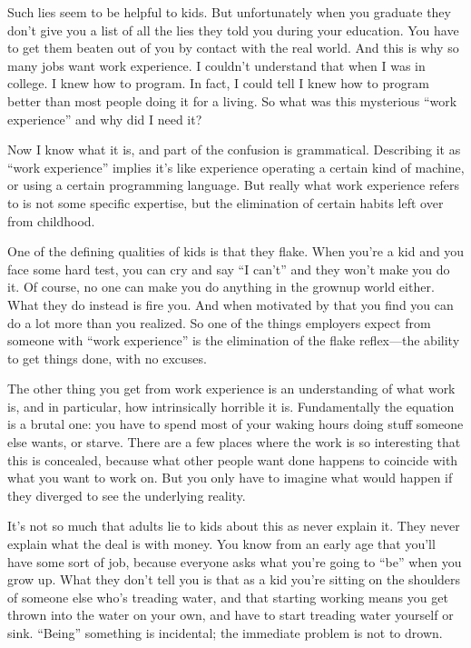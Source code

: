 Such lies seem to be helpful to kids. But unfortunately when you
graduate they don't give you a list of all the lies they told you during
your education. You have to get them beaten out of you by contact with
the real world. And this is why so many jobs want work experience. I
couldn't understand that when I was in college. I knew how to program.
In fact, I could tell I knew how to program better than most people
doing it for a living. So what was this mysterious ``work experience''
and why did I need it?

Now I know what it is, and part of the confusion is grammatical.
Describing it as ``work experience'' implies it's like experience
operating a certain kind of machine, or using a certain programming
language. But really what work experience refers to is not some specific
expertise, but the elimination of certain habits left over from
childhood.

One of the defining qualities of kids is that they flake. When you're a
kid and you face some hard test, you can cry and say ``I can't'' and
they won't make you do it. Of course, no one can make you do anything in
the grownup world either. What they do instead is fire you. And when
motivated by that you find you can do a lot more than you realized. So
one of the things employers expect from someone with ``work experience''
is the elimination of the flake reflex---the ability to get things done,
with no excuses.

The other thing you get from work experience is an understanding of what
work is, and in particular, how intrinsically horrible it is.
Fundamentally the equation is a brutal one: you have to spend most of
your waking hours doing stuff someone else wants, or starve. There are a
few places where the work is so interesting that this is concealed,
because what other people want done happens to coincide with what you
want to work on. But you only have to imagine what would happen if they
diverged to see the underlying reality.

It's not so much that adults lie to kids about this as never explain it.
They never explain what the deal is with money. You know from an early
age that you'll have some sort of job, because everyone asks what you're
going to ``be'' when you grow up. What they don't tell you is that as a
kid you're sitting on the shoulders of someone else who's treading
water, and that starting working means you get thrown into the water on
your own, and have to start treading water yourself or sink. ``Being''
something is incidental; the immediate problem is not to drown.

